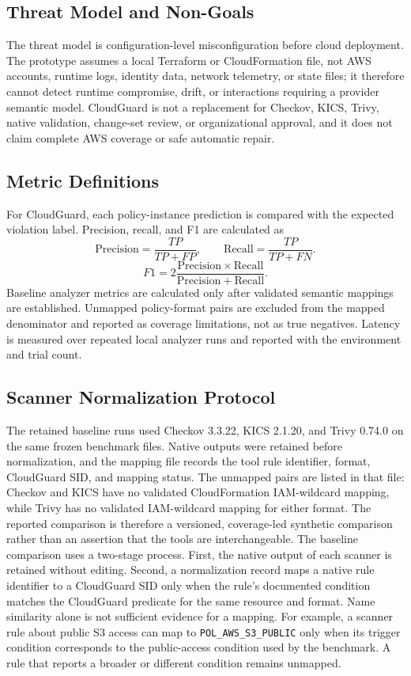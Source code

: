 \documentclass[conference]{IEEEtran}
\begin{document}
\subsection{Threat Model and Non-Goals}
The threat model is configuration-level misconfiguration before cloud deployment. The prototype assumes a local Terraform or CloudFormation file, not AWS accounts, runtime logs, identity data, network telemetry, or state files; it therefore cannot detect runtime compromise, drift, or interactions requiring a provider semantic model. CloudGuard is not a replacement for Checkov, KICS, Trivy, native validation, change-set review, or organizational approval, and it does not claim complete AWS coverage or safe automatic repair.

\subsection{Metric Definitions}
For CloudGuard, each policy-instance prediction is compared with the expected violation label. Precision, recall, and F1 are calculated as
\begin{equation}
\mathrm{Precision}=\frac{TP}{TP+FP}, \qquad
\mathrm{Recall}=\frac{TP}{TP+FN}.
\end{equation}
\begin{equation}
F1=2\frac{\mathrm{Precision}\times\mathrm{Recall}}
{\mathrm{Precision}+\mathrm{Recall}}.
\end{equation}
Baseline analyzer metrics are calculated only after validated semantic mappings are established. Unmapped policy-format pairs are excluded from the mapped denominator and reported as coverage limitations, not as true negatives. Latency is measured over repeated local analyzer runs and reported with the environment and trial count.

\subsection{Scanner Normalization Protocol}
The retained baseline runs used Checkov 3.3.22, KICS 2.1.20, and Trivy 0.74.0 on the same frozen benchmark files. Native outputs were retained before normalization, and the mapping file records the tool rule identifier, format, CloudGuard SID, and mapping status. The unmapped pairs are listed in that file: Checkov and KICS have no validated CloudFormation IAM-wildcard mapping, while Trivy has no validated IAM-wildcard mapping for either format. The reported comparison is therefore a versioned, coverage-led synthetic comparison rather than an assertion that the tools are interchangeable.
The baseline comparison uses a two-stage process. First, the native output of each scanner is retained without editing. Second, a normalization record maps a native rule identifier to a CloudGuard SID only when the rule's documented condition matches the CloudGuard predicate for the same resource and format. Name similarity alone is not sufficient evidence for a mapping. For example, a scanner rule about public S3 access can map to \texttt{POL\_AWS\_S3\_PUBLIC} only when its trigger condition corresponds to the public-access condition used by the benchmark. A rule that reports a broader or different condition remains unmapped.
\end{document}

